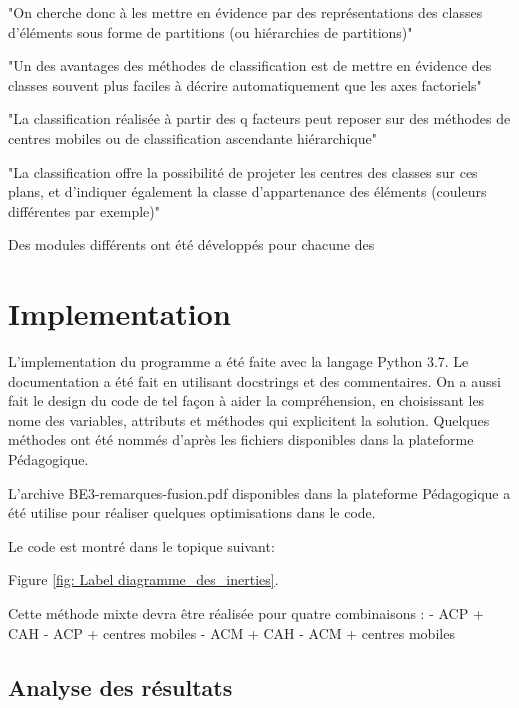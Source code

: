 \documentclass{rapportECL}
\begin{document}
"On cherche donc à les mettre en évidence
par des représentations des classes
d’éléments sous forme de partitions (ou
hiérarchies de partitions)" %

"Un des avantages des méthodes de
classification est de mettre en évidence des
classes souvent plus faciles à décrire
automatiquement que les axes factoriels" %

"La classification réalisée à partir des q facteurs
peut reposer sur des méthodes de centres
mobiles ou de classification ascendante
hiérarchique" %

"La classification offre la possibilité de projeter les centres des 
classes sur ces plans, et d’indiquer également la classe
d’appartenance des éléments (couleurs différentes par exemple)"%


Des modules différents ont été développés pour chacune des 

\section{Implementation}

L'implementation du programme a été faite avec la langage Python 3.7. Le documentation a été fait en utilisant docstrings et des commentaires. On a aussi fait le design du code de tel façon  à aider la compréhension, en choisissant les nome des variables, attributs et méthodes qui explicitent la solution. Quelques méthodes ont été nommés d'après les fichiers disponibles dans la plateforme Pédagogique.

L'archive BE3-remarques-fusion.pdf disponibles dans la plateforme Pédagogique a été utilise pour réaliser quelques optimisations dans le code.

Le code est montré dans le topique suivant:

Figure \ref{fig: Label diagramme_des_inerties}.


Cette méthode mixte devra être réalisée pour quatre combinaisons :
- ACP + CAH
- ACP + centres mobiles
- ACM + CAH
- ACM + centres mobiles



\subsection{Analyse des résultats}
\end{document}
